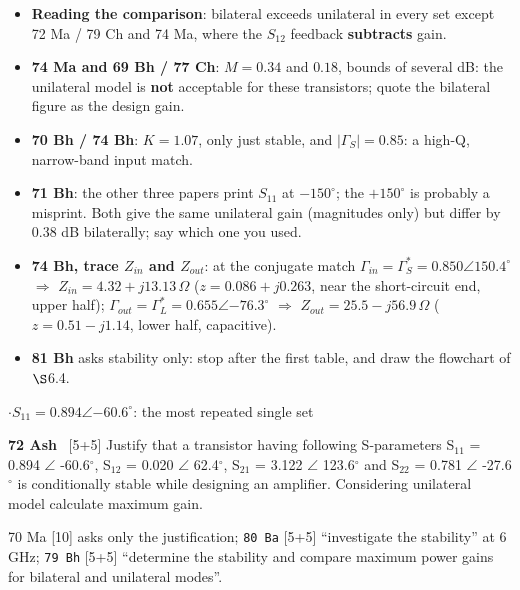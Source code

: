 \begin{itemize}
  \item \textbf{Reading the comparison}: bilateral exceeds unilateral in every set except
    72 Ma / 79 Ch and 74 Ma, where the $S_{12}$ feedback \textbf{subtracts} gain.
  \item \textbf{74 Ma and 69 Bh / 77 Ch}: $M = 0.34$ and $0.18$, bounds of several dB: the
    unilateral model is \textbf{not} acceptable for these transistors; quote the bilateral
    figure as the design gain.
  \item \textbf{70 Bh / 74 Bh}: $K = 1.07$, only just stable, and $|\Gamma_S| = 0.85$: a
    high-Q, narrow-band input match.
  \item \textbf{71 Bh}: the other three papers print $S_{11}$ at $-150^\circ$; the $+150^\circ$
    is probably a misprint. Both give the same unilateral gain (magnitudes only) but differ
    by 0.38 dB bilaterally; say which one you used.
  \item \textbf{74 Bh, trace $Z_{in}$ and $Z_{out}$}: at the conjugate match
    $\Gamma_{in} = \Gamma_S^* = 0.850\angle150.4^\circ$ $\Rightarrow$
    $Z_{in} = 4.32 + j13.13\,\Omega$ ($z = 0.086 + j0.263$, near the short-circuit end, upper
    half); $\Gamma_{out} = \Gamma_L^* = 0.655\angle{-76.3^\circ}$ $\Rightarrow$
    $Z_{out} = 25.5 - j56.9\,\Omega$ ($z = 0.51 - j1.14$, lower half, capacitive).
  \item \textbf{81 Bh} asks stability only: stop after the first table, and draw the flowchart
    of $\S$6.4.
\end{itemize}

\vspace{2pt}

{\color{sub}\footnotesize {} \gap$\cdot$\gap $S_{11} = 0.894\angle{-60.6^\circ}$: the most repeated single set}

\begin{asked}{\textbf{72 Ash} \ [5+5]}
Justify that a transistor having following S-parameters S$_{11}$ = 0.894 $\angle$ -60.6$^\circ$, S$_{12}$ = 0.020 $\angle$ 62.4$^\circ$, S$_{21}$ = 3.122 $\angle$ 123.6$^\circ$ and S$_{22}$ = 0.781 $\angle$ -27.6$^\circ$ is conditionally stable while designing an amplifier. Considering unilateral model calculate maximum gain.
\end{asked}
{\color{sub}\footnotesize 70 Ma [10] asks only the justification; \texttt{80 Ba} [5+5] ``investigate the stability'' at 6 GHz; \texttt{79 Bh} [5+5] ``determine the stability and compare maximum power gains for bilateral and unilateral modes''.}

